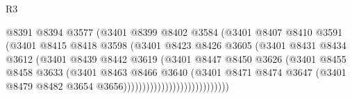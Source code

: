 \begin{lexlean}{R3}
\begin{coremodule}
                                      @8391
                                      @8394
                                      @3577
                                      (@3401
                                        @8399
                                        @8402
                                        @3584
                                        (@3401
                                          @8407
                                          @8410
                                          @3591
                                          (@3401
                                            @8415
                                            @8418
                                            @3598
                                            (@3401
                                              @8423
                                              @8426
                                              @3605
                                              (@3401
                                                @8431
                                                @8434
                                                @3612
                                                (@3401
                                                  @8439
                                                  @8442
                                                  @3619
                                                  (@3401
                                                    @8447
                                                    @8450
                                                    @3626
                                                    (@3401
                                                      @8455
                                                      @8458
                                                      @3633
                                                      (@3401
                                                        @8463
                                                        @8466
                                                        @3640
                                                        (@3401
                                                          @8471
                                                          @8474
                                                          @3647
                                                          (@3401
                                                            @8479
                                                            @8482
                                                            @3654
                                                            @3656))))))))))))))))))))))))))))

\end{coremodule}
\end{lexlean}
